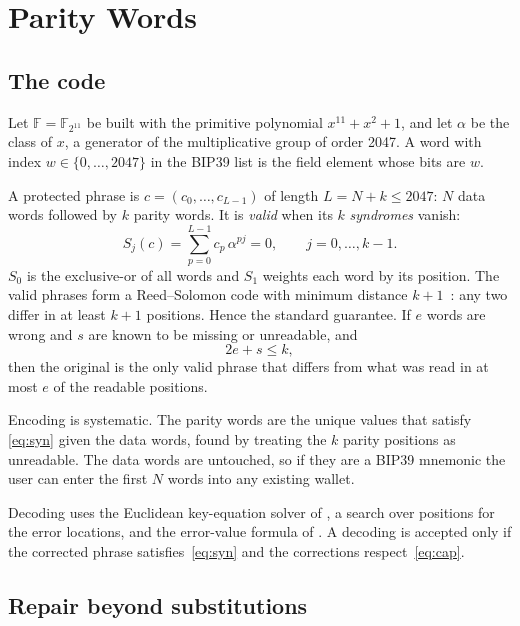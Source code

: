 \documentclass[numeric]{anvil-paper}
\newcommand{\F}{\mathbb{F}}
\begin{document}
\section{Parity Words}
\label{sec:parity}

\subsection{The code}

Let $\F=\F_{2^{11}}$ be built with the primitive polynomial $x^{11}+x^2+1$, and
let $\alpha$ be the class of $x$, a generator of the multiplicative group of
order 2047. A word with index $w\in\{0,\dots,2047\}$ in the BIP39 list is the
field element whose bits are $w$.

A protected phrase is $c=(c_0,\dots,c_{L-1})$ of length $L=N+k\le 2047$: $N$
data words followed by $k$ parity words. It is \emph{valid} when its $k$
\emph{syndromes} vanish:
\begin{equation}
S_j(c)=\sum_{p=0}^{L-1} c_p\,\alpha^{pj}=0,\qquad j=0,\dots,k-1 .
\label{eq:syn}
\end{equation}
$S_0$ is the exclusive-or of all words and $S_1$ weights each word by its
position. The valid phrases form a Reed--Solomon code with minimum distance
$k+1$~\citep{reed1960polynomial}: any two differ in at least $k+1$ positions.
Hence the standard guarantee. If $e$ words are wrong and $s$ are known to be
missing or unreadable, and
\begin{equation}
2e+s\le k ,
\label{eq:cap}
\end{equation}
then the original is the only valid phrase that differs from what was read in
at most $e$ of the readable positions.

Encoding is systematic. The parity words are the unique values that satisfy
\eqref{eq:syn} given the data words, found by treating the $k$ parity positions
as unreadable. The data words are untouched, so if they are a BIP39 mnemonic
the user can enter the first $N$ words into any existing wallet.

Decoding uses the Euclidean key-equation solver of \citet{sugiyama1975method},
a search over positions for the error locations, and the error-value formula of
\citet{forney1965decoding}. A decoding is accepted only if the corrected phrase
satisfies~\eqref{eq:syn} and the corrections respect~\eqref{eq:cap}.

\subsection{Repair beyond substitutions}
\end{document}
